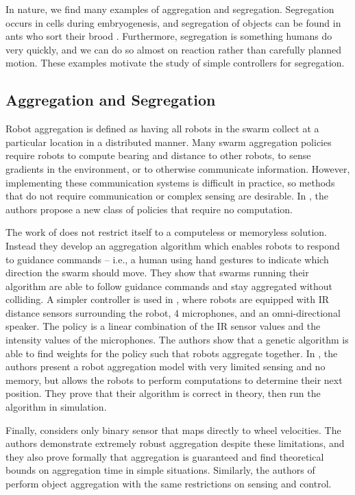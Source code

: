 \documentclass[conference]{IEEEtran}
\begin{document}
  In nature, we find many examples of aggregation and segregation. Segregation occurs in cells during embryogenesis, and segregation of objects can be found in ants who sort their brood \cite{santos_segregation_2014}. Furthermore, segregation is something humans do very quickly, and we can do so almost on reaction rather than carefully planned motion. These examples motivate the study of simple controllers for segregation.

  \subsection{Aggregation and Segregation}
    Robot aggregation is defined as having all robots in the swarm collect at a particular location in a distributed manner. Many swarm aggregation policies require robots to compute bearing and distance to other robots, to sense gradients in the environment, or to otherwise communicate information. However, implementing these communication systems is difficult in practice, so methods that do not require communication or complex sensing are desirable. In \cite{gauci_self-organized_2014}, the authors propose a new class of policies that require no computation.

    The work of \cite{gasparri_swarm_2012} does not restrict itself to a computeless or memoryless solution. Instead they develop an aggregation algorithm which enables robots to respond to guidance commands -- i.e., a human using hand gestures to indicate which direction the swarm should move. They show that swarms running their algorithm are able to follow guidance commands and stay aggregated without colliding. A simpler controller is used in \cite{bahgeci_evolving_2005}, where robots are equipped with IR distance sensors surrounding the robot, 4 microphones, and an omni-directional speaker. The policy is a linear combination of the IR sensor values and the intensity values of the microphones. The authors show that a genetic algorithm is able to find weights for the policy such that robots aggregate together. In \cite{ando_distributed_1999}, the authors present a robot aggregation model with very limited sensing and no memory, but allows the robots to perform computations to determine their next position. They prove that their algorithm is correct in theory, then run the algorithm in simulation.

    Finally, \cite{gauci_self-organized_2014} considers only binary sensor that maps directly to wheel velocities. The authors demonstrate extremely robust aggregation despite these limitations, and they also prove formally that aggregation is guaranteed and find theoretical bounds on aggregation time in simple situations. Similarly, the authors of \cite{gauci_clustering_2014} perform object aggregation with the same restrictions on sensing and control.
\end{document}
